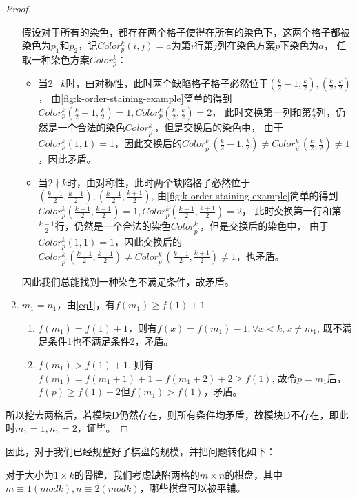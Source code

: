 \begin{proof}
\begin{enumerate}
              假设对于所有的染色，都存在两个格子使得在所有的染色下，这两个格子都被染色为$p_1$和$p_2$，记$Color^k_p(i, j) = a$为第$i$行第$j$列在染色方案$p$下染色为$a$，
              任取一种染色方案$Color^k_p$：
              \begin{itemize}
                  \item 当$2 \mid k$时，由对称性，此时两个缺陷格子格子必然位于$(\frac{k}{2} - 1,\frac{k}{2}), (\frac{k}{2},\frac{k}{2})$，
                        由\ref{fig:k-order-staining-example}简单的得到$Color^k_p(\frac{k}{2} - 1,\frac{k}{2}) = 1, Color^k_p(\frac{k}{2},\frac{k}{2}) = 2$，
                        此时交换第一列和第$\frac{k}{2}$列，仍然是一个合法的染色$Color^k_{p^{'}}$，但是交换后的染色中，
                        由于$Color^k_p(1, 1) = 1$，因此交换后的$Color^k_{p^{'}}(\frac{k}{2} - 1,\frac{k}{2}) \neq Color^k_{p^{'}}(\frac{k}{2},\frac{k}{2}) \neq 1$，因此矛盾。
                  \item 当$2 \nmid k$时，由对称性，此时两个缺陷格子必然位于$(\frac{k - 1}{2},\frac{k - 1}{2}), (\frac{k - 1}{2},\frac{k + 1}{2})$,
                        由\ref{fig:k-order-staining-example}简单的得到$Color^k_p(\frac{k - 1}{2},\frac{k - 1}{2}) = 1, Color^k_p(\frac{k - 1}{2},\frac{k + 1}{2}) = 2$，
                        此时交换第一行和第$\frac{k - 1}{2}$行，仍然是一个合法的染色$Color^k_{p^{'}}$，但是交换后的染色中，
                        由于$Color^k_p(1, 1) = 1$，因此交换后的$Color^k_{p^{'}}(\frac{k - 1}{2},\frac{k - 1}{2}) \neq Color^k_{p^{'}}(\frac{k - 1}{2},\frac{k + 1}{2}) \neq 1$，也矛盾。
              \end{itemize}
              因此我们总能找到一种染色不满足条件，故矛盾。
        \item $m_1 = n_1$，由\ref{eq1}，有$f(m_1) \ge f(1) + 1$
              \begin{enumerate}
                  \item $f(m_1) = f(1) + 1$，则有$f(x) = f(m_1) - 1, \forall x < k, x \neq m_1$, 既不满足条件1也不满足条件2，矛盾。
                  \item $f(m_1) > f(1) + 1$, 则有$f(m_1) = f(m_1 + 1) + 1 = f(m_1 + 2) + 2 \ge f(1)$, 故令$p = m_1$后，$f(p) \ge f(1) + 2$但$f(m_1) > f(1)$，矛盾。
              \end{enumerate}
    \end{enumerate}

    所以挖去两格后，若模块D仍然存在，则所有条件均矛盾，故模块D不存在，即此时$m_1 = 1, n_1 = 2$，证毕。
\end{proof}

因此，对于我们已经规整好了棋盘的规模，并把问题转化如下：

对于大小为$1 \times k$的骨牌，我们考虑缺陷两格的$m \times n$的棋盘，其中$m \equiv 1 (mod k), n \equiv 2 (mod k)$，哪些棋盘可以被平铺。

\clearpage